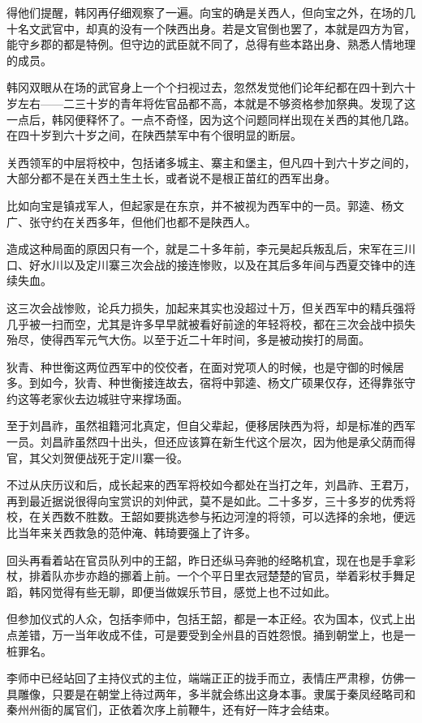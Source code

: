 得他们提醒，韩冈再仔细观察了一遍。向宝的确是关西人，但向宝之外，在场的几十名文武官中，却真的没有一个陕西出身。若是文官倒也罢了，本就是四方为官，能守乡郡的都是特例。但守边的武臣就不同了，总得有些本路出身、熟悉人情地理的成员。

韩冈双眼从在场的武官身上一个个扫视过去，忽然发觉他们论年纪都在四十到六十岁左右——二三十岁的青年将佐官品都不高，本就是不够资格参加祭典。发现了这一点后，韩冈便释怀了。一点不奇怪，因为这个问题同样出现在关西的其他几路。在四十岁到六十岁之间，在陕西禁军中有个很明显的断层。

关西领军的中层将校中，包括诸多城主、寨主和堡主，但凡四十到六十岁之间的，大部分都不是在关西土生土长，或者说不是根正苗红的西军出身。

比如向宝是镇戎军人，但起家是在东京，并不被视为西军中的一员。郭逵、杨文广、张守约在关西多年，但他们也都不是陕西人。

造成这种局面的原因只有一个，就是二十多年前，李元昊起兵叛乱后，宋军在三川口、好水川以及定川寨三次会战的接连惨败，以及在其后多年间与西夏交锋中的连续失血。

这三次会战惨败，论兵力损失，加起来其实也没超过十万，但关西军中的精兵强将几乎被一扫而空，尤其是许多早早就被看好前途的年轻将校，都在三次会战中损失殆尽，使得西军元气大伤。以至于近二十年时间，多是被动挨打的局面。

狄青、种世衡这两位西军中的佼佼者，在面对党项人的时候，也是守御的时候居多。到如今，狄青、种世衡接连故去，宿将中郭逵、杨文广硕果仅存，还得靠张守约这等老家伙去边城驻守来撑场面。

至于刘昌祚，虽然祖籍河北真定，但自父辈起，便移居陕西为将，却是标准的西军一员。刘昌祚虽然四十出头，但还应该算在新生代这个层次，因为他是承父荫而得官，其父刘贺便战死于定川寨一役。

不过从庆历议和后，成长起来的西军将校如今都处在当打之年，刘昌祚、王君万，再到最近据说很得向宝赏识的刘仲武，莫不是如此。二十多岁，三十多岁的优秀将校，在关西数不胜数。王韶如要挑选参与拓边河湟的将领，可以选择的余地，便远比当年来关西救急的范仲淹、韩琦要强上了许多。

回头再看着站在官员队列中的王韶，昨日还纵马奔驰的经略机宜，现在也是手拿彩杖，排着队亦步亦趋的挪着上前。一个个平日里衣冠楚楚的官员，举着彩杖手舞足蹈，韩冈觉得有些无聊，即便当做娱乐节目，感觉上也不过如此。

但参加仪式的人众，包括李师中，包括王韶，都是一本正经。农为国本，仪式上出点差错，万一当年收成不佳，可是要受到全州县的百姓怨恨。捅到朝堂上，也是一桩罪名。

李师中已经站回了主持仪式的主位，端端正正的拢手而立，表情庄严肃穆，仿佛一具雕像，只要是在朝堂上待过两年，多半就会练出这身本事。隶属于秦凤经略司和秦州州衙的属官们，正依着次序上前鞭牛，还有好一阵才会结束。

